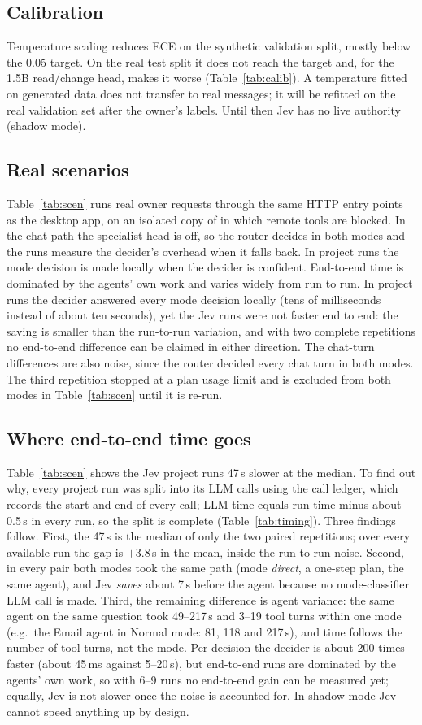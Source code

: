 \subsection{Calibration}

Temperature scaling reduces ECE on the synthetic validation split, mostly below the 0.05 target. On the real test split it does not reach the target and, for the 1.5B read/change head, makes it worse (Table~\ref{tab:calib}). A temperature fitted on generated data does not transfer to real messages; it will be refitted on the real validation set after the owner's labels. Until then Jev has no live authority (shadow mode).
\subsection{Real scenarios}

Table~\ref{tab:scen} runs real owner requests through the same HTTP entry points as the desktop app, on an isolated copy of \sys{} in which remote tools are blocked. In the chat path the specialist head is off, so the router decides in both modes and the runs measure the decider's overhead when it falls back. In project runs the mode decision is made locally when the decider is confident. End-to-end time is dominated by the agents' own work and varies widely from run to run. In project runs the decider answered every mode decision locally (tens of milliseconds instead of about ten seconds), yet the Jev runs were not faster end to end: the saving is smaller than the run-to-run variation, and with two complete repetitions no end-to-end difference can be claimed in either direction. The chat-turn differences are also noise, since the router decided every chat turn in both modes. The third repetition stopped at a plan usage limit and is excluded from both modes in Table~\ref{tab:scen} until it is re-run.
\subsection{Where end-to-end time goes}

Table~\ref{tab:scen} shows the Jev project runs 47\,s slower at the median. To find out why, every project run was split into its LLM calls using the call ledger, which records the start and end of every call; LLM time equals run time minus about 0.5\,s in every run, so the split is complete (Table~\ref{tab:timing}). Three findings follow. First, the 47\,s is the median of only the two paired repetitions; over every available run the gap is $+3.8$\,s in the mean, inside the run-to-run noise. Second, in every pair both modes took the same path (mode \emph{direct}, a one-step plan, the same agent), and Jev \emph{saves} about 7\,s before the agent because no mode-classifier LLM call is made. Third, the remaining difference is agent variance: the same agent on the same question took 49--217\,s and 3--19 tool turns within one mode (e.g.\ the Email agent in Normal mode: 81, 118 and 217\,s), and time follows the number of tool turns, not the mode. Per decision the decider is about 200 times faster (about 45\,ms against 5--20\,s), but end-to-end runs are dominated by the agents' own work, so with 6--9 runs no end-to-end gain can be measured yet; equally, Jev is not slower once the noise is accounted for. In shadow mode Jev cannot speed anything up by design. \prov{}
